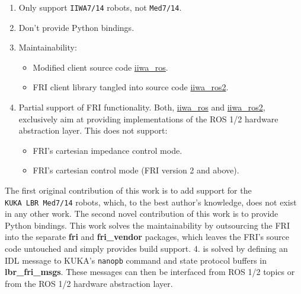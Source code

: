 \begin{enumerate}
\def\labelenumi{\arabic{enumi}.}
\item
  Only support \texttt{IIWA7/14} robots, not \texttt{Med7/14}.
\item
  Don't provide Python bindings.
\item
  Maintainability:

  \begin{itemize}
  \item
    Modified client source code
    \href{https://github.com/epfl-lasa/iiwa_ros}{iiwa\_ros}.
  \item
    FRI client library tangled into source code
    \href{https://github.com/ICube-Robotics/iiwa_ros2}{iiwa\_ros2}.
  \end{itemize}
\item
  Partial support of FRI functionality. Both,
  \href{https://github.com/epfl-lasa/iiwa_ros}{iiwa\_ros} and
  \href{https://github.com/ICube-Robotics/iiwa_ros2}{iiwa\_ros2},
  exclusively aim at providing implementations of the ROS 1/2 hardware
  abstraction layer. This does not support:

  \begin{itemize}
  \item
    FRI's cartesian impedance control mode.
  \item
    FRI's cartesian control mode (FRI version 2 and above).
  \end{itemize}
\end{enumerate}

The first original contribution of this work is to add support for the
\texttt{KUKA\ LBR\ Med7/14} robots, which, to the best author's
knowledge, does not exist in any other work. The second novel
contribution of this work is to provide Python bindings. This work
solves the maintainability by outsourcing the FRI into the separate
\textbf{fri} and \textbf{fri\_vendor} packages, which leaves the FRI's
source code untouched and simply provides build support. 4. is solved by
defining an IDL message to KUKA's \texttt{nanopb} command and state
protocol buffers in \textbf{lbr\_fri\_msgs}. These messages can then be
interfaced from ROS 1/2 topics or from the ROS 1/2 hardware abstraction
layer.

